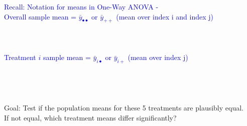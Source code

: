 \textcolor{blue}{Recall:  Notation for means in One-Way ANOVA -\\
Overall sample mean = $\bar{y}_{\bullet\bullet}$ or $\bar{y}_{++}$ (mean over index i and index j)\\~\\~\\~\\
Treatment $i$ sample mean = $\bar{y}_{i\bullet}$ or $\bar{y}_{i+}$ (mean over index j)}\\~\\~\\~\\~\\

Goal: Test if the population means for these 5 treatments are plausibly equal. \\
If not equal, which treatment means differ significantly? 

\newpage

